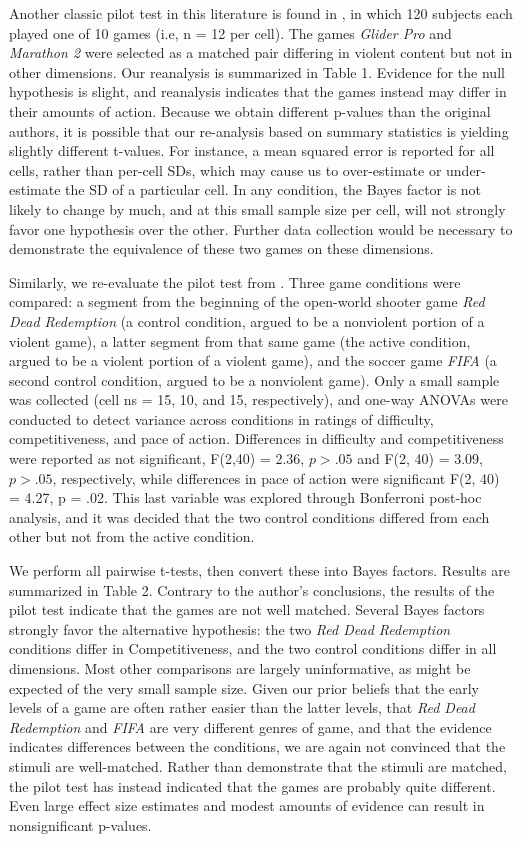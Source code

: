 \documentclass[fignum,nobf,man]{apa}
\begin{document}
Another classic pilot test in this literature is found in \citet[study 1]{Anderson:etal:2004}, in which 120 subjects each played one of 10 games (i.e, n = 12 per cell). The games {\em Glider Pro} and {\em Marathon 2} were selected as a matched pair differing in violent content but not in other dimensions. Our reanalysis is summarized in Table 1. Evidence for the null hypothesis is slight, and reanalysis indicates that the games instead may differ in their amounts of action. Because we obtain different p-values than the original authors, it is possible that our re-analysis based on summary statistics is yielding slightly different t-values. For instance, a mean squared error is reported for all cells, rather than per-cell SDs, which may cause us to over-estimate or under-estimate the SD of a particular cell. In any condition, the Bayes factor is not likely to change by much, and at this small sample size per cell, will not strongly favor one hypothesis over the other. Further data collection would be necessary to demonstrate the equivalence of these two games on these dimensions. 

Similarly, we re-evaluate the pilot test from \citet{Valadez:Ferguson:2010}. Three game conditions were compared: a segment from the beginning of the open-world shooter game {\em Red Dead Redemption} (a control condition, argued to be a nonviolent portion of a violent game), a latter segment from that same game (the active condition, argued to be a violent portion of a violent game), and the soccer game {\em FIFA} (a second control condition, argued to be a nonviolent game). Only a small sample was collected (cell ns = 15, 10, and 15, respectively), and one-way ANOVAs were conducted to detect variance across conditions in ratings of difficulty, competitiveness, and pace of action. Differences in difficulty and competitiveness were reported as not significant, F(2,40) = 2.36, $p > .05$ and F(2, 40) = 3.09, $p > .05$, respectively, while differences in pace of action were significant F(2, 40) = 4.27, p = .02. This last variable was explored through Bonferroni post-hoc analysis, and it was decided that the two control conditions differed from each other but not from the active condition.

We perform all pairwise t-tests, then convert these into Bayes factors. Results are summarized in Table 2. Contrary to the author's conclusions, the results of the pilot test indicate that the games are not well matched. Several Bayes factors strongly favor the alternative hypothesis: the two {\em Red Dead Redemption} conditions differ in Competitiveness, and the two control conditions differ in all dimensions. Most other comparisons are largely uninformative, as might be expected of the very small sample size. Given our prior beliefs that the early levels of a game are often rather easier than the latter levels, that {\em Red Dead Redemption} and {\em FIFA} are very different genres of game, and that the evidence indicates differences between the conditions, we are again not convinced that the stimuli are well-matched. Rather than demonstrate that the stimuli are matched, the pilot test has instead indicated that the games are probably quite different. Even large effect size estimates and modest amounts of evidence can result in nonsignificant p-values.
\end{document}
